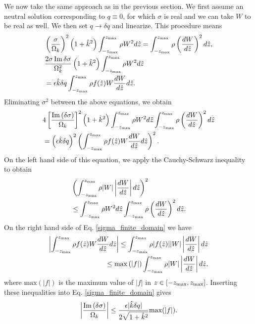 We now take the same approach as in the previous section. We first
assume an neutral solution corresponding to $q\equiv0$, for which
$\sigma$ is real and we can take $W$ to be real as well. We then
set $q\to\delta q$ and linearize. This procedure means
\begin{align}
  &\left(\frac{\sigma}{\Omega_k}\right)^2\left(1+\hat{k}^2\right)
  \int_{-z_\mathrm{max}}^{z_\mathrm{max}}\rho W^2d\hat{z}  
  =\int_{-z_\mathrm{max}}^{z_\mathrm{max}}\rho\left(\frac{dW}{d\hat{z}}\right)^2d\hat{z},\\ 
  &\frac{2\sigma\operatorname{Im}{\delta\sigma}}{\Omega_k^2}\left(1+\hat{k}^2\right)
  \int_{-z_\mathrm{max}}^{z_\mathrm{max}}\rho W^2d\hat{z}\notag\\
  &=\epsilon\hat{k}\delta q\int_{-z_\mathrm{max}}^{z_\mathrm{max}}\rho
  f(\hat{z}) W\frac{dW}{d\hat{z}}d\hat{z}. 
\end{align}
Eliminating $\sigma^2$ between the above equations, we obtain
\begin{align}\label{sigma_finite_domain}
  &4
  \left[\frac{\operatorname{Im}{\left(\delta\sigma\right)}}{\Omega_k}\right]^2\left(1+\hat{k}^2\right) 
  \int_{-z_\mathrm{max}}^{z_\mathrm{max}}\rho
  W^2d\hat{z}\int_{-z_\mathrm{max}}^{z_\mathrm{max}}\rho\left(\frac{dW}{d\hat{z}}\right)^2d\hat{z}\notag\\
  &=\left(\epsilon\hat{k}\delta q\right)^2\left(\int_{-z_\mathrm{max}}^{z_\mathrm{max}}\rho
  f(\hat{z}) W\frac{dW}{d\hat{z}}d\hat{z}\right)^2. 
\end{align}
On the left hand side of this equation, we apply the Cauchy-Schwarz
inequality to obtain
\begin{align}
  &\left( \int_{-z_\mathrm{max}}^{z_\mathrm{max}}\rho
    |W|\left|\frac{dW}{d\hat{z}}\right|d\hat{z}\right)^2\notag\\&\leq
  \int_{-z_\mathrm{max}}^{z_\mathrm{max}}\rho 
  W^2d\hat{z}\int_{-z_\mathrm{max}}^{z_\mathrm{max}}\rho\left(\frac{dW}{d\hat{z}}\right)^2d\hat{z}.
\end{align}
On the right hand side of Eq. \ref{sigma_finite_domain} we have
\begin{align}
  \left|\int_{-z_\mathrm{max}}^{z_\mathrm{max}}\rho
    f(\hat{z}) W\frac{dW}{d\hat{z}}d\hat{z}\right|\leq \int_{-z_\mathrm{max}}^{z_\mathrm{max}}\rho
  |f(\hat{z})| |W|\left|\frac{dW}{d\hat{z}}\right|d\hat{z} \notag\\
  \leq
  \mathrm{max}\left(|f|\right)\int_{-z_\mathrm{max}}^{z_\mathrm{max}}\rho
  |W|\left|\frac{dW}{d\hat{z}}\right|d\hat{z},
\end{align}
where $\mathrm{max}(|f|)$ is the maximum value of $|f|$ in
$z\in[-z_\mathrm{max},z_\mathrm{max}]$. Inserting these inequalities into
Eq. \ref{sigma_finite_domain} gives
\begin{align}
  \left|\frac{\operatorname{Im}{(\delta\sigma)}}{\Omega_k}\right| \leq
  \frac{\epsilon |\hat{k}\delta
    q|}{2\sqrt{1+\hat{k}^2}}\mathrm{max}(|f|). 
\end{align}





